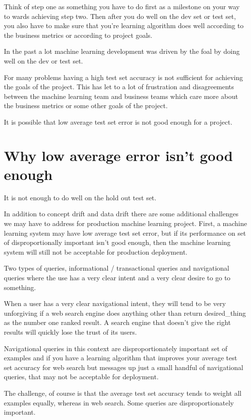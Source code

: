 Think of step one as something you have to do first as a milestone on your way to wards achieving step two.
Then after you do well on the dev set or test set, you also have to make sure that you're learning algorithm does well according to the business metrics or according to project goals.

In the past a lot machine learning development was driven by the foal by doing well on the dev or test set.

For many problems having a high test set accuracy is not sufficient for achieving the goals of the project.
This has let to a lot of frustration and disagreements between the machine learning team and business teams which care more about the business metrics or some other goals of the project.

It is possible that low average test set error is not good enough for a project.

\section{Why low average error isn't good enough}

It is not enough to do well on the hold out test set.

In addition to concept drift and data drift there are some additional challenges we may have to address for production machine learning project.
First, a machine learning system may have low average test set error, but if its performance on  set of disproportionally important isn't  good enough, then the machine learning system will still not be acceptable for production deployment.

Two types of queries, informational / transactional queries and navigational queries where the use has a very clear intent and a very clear desire to go to something.

When a user has a very clear navigational intent, they will tend to be very unforgiving if a web search engine does anything other than return desired_thing as the number one ranked result.
A search engine that doesn't give the right results will quickly lose the trust of its users.

Navigational queries in this context are disproportionately important set of examples and if you have a learning algorithm that improves your average test set accuracy for web search but messages up just a small handful of navigational queries, that may not be acceptable for deployment.

The challenge, of course is that the average test set accuracy tends to weight all examples equally, whereas in web search.
Some queries are disproportionately important.


